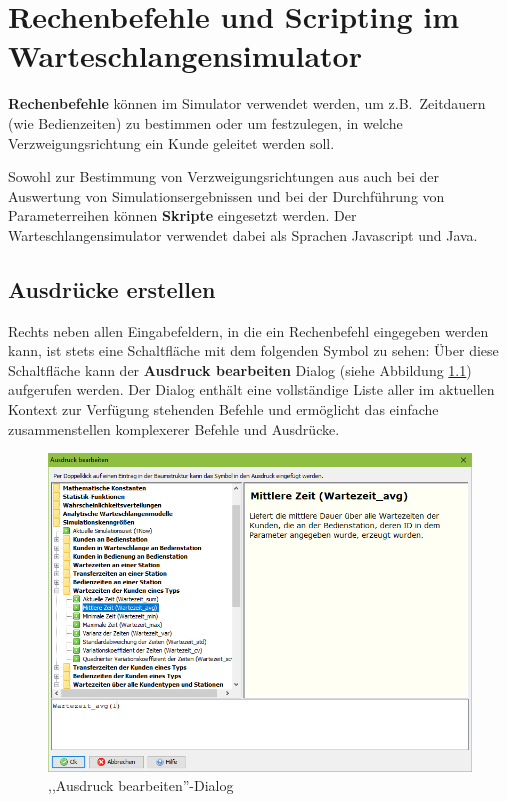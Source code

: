 \chapter{Rechenbefehle und Scripting im Warteschlangensimulator}

\renewcommand{\thepage}{\arabic{page}}
\setcounter{page}{1}

\textbf{Rechenbefehle} können im Simulator verwendet werden, um z.B.\ Zeitdauern
(wie Bedienzeiten) zu bestimmen oder um festzulegen, in welche
Verzweigungsrichtung ein Kunde geleitet werden soll.

Sowohl zur Bestimmung von Verzweigungsrichtungen aus auch bei der Auswertung von
Simulationsergebnissen und bei der Durchführung von Parameterreihen können
\textbf{Skripte} eingesetzt werden. Der Warteschlangensimulator verwendet dabei
als Sprachen Javascript und Java.

\section{Ausdrücke erstellen}

Rechts neben allen Eingabefeldern, in die ein Rechenbefehl eingegeben werden kann, ist
stets eine Schaltfläche mit dem folgenden Symbol zu sehen:
Über diese Schaltfläche kann der \textbf{Ausdruck bearbeiten} Dialog
(siehe Abbildung \ref{fig:ExpressionBuilder}) aufgerufen werden.
Der Dialog enthält eine vollständige Liste aller im aktuellen Kontext zur Verfügung
stehenden Befehle und ermöglicht das einfache zusammenstellen komplexerer Befehle und
Ausdrücke.

\begin{figure}[ht]	
	\caption{,,Ausdruck bearbeiten''-Dialog}
	\centerline{\includegraphics[width=14cm]{DialogExpressionBuilder.png}}
	\label{fig:ExpressionBuilder}
\end{figure}